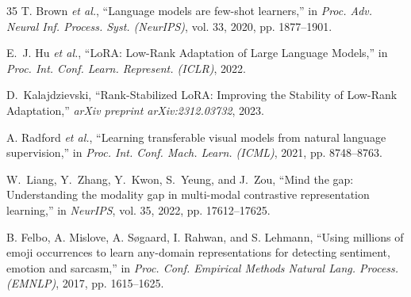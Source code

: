 \documentclass[letterpaper,journal]{IEEEtran}
\begin{document}
\begin{thebibliography}{35}
 T. Brown \textit{et al.}, ``Language models are few-shot learners,'' in \textit{Proc. Adv. Neural Inf. Process. Syst. (NeurIPS)}, vol. 33, 2020, pp. 1877--1901.

 E.~J. Hu \textit{et al.}, ``LoRA: Low-Rank Adaptation of Large Language Models,'' in \textit{Proc. Int. Conf. Learn. Represent. (ICLR)}, 2022.

 D.~Kalajdzievski, ``Rank-Stabilized LoRA: Improving the Stability of Low-Rank Adaptation,'' \textit{arXiv preprint arXiv:2312.03732}, 2023.

 A. Radford \textit{et al.}, ``Learning transferable visual models from natural language supervision,'' in \textit{Proc. Int. Conf. Mach. Learn. (ICML)}, 2021, pp. 8748--8763.

 W.~Liang, Y.~Zhang, Y.~Kwon, S.~Yeung, and J.~Zou, ``Mind the gap: Understanding the modality gap in multi-modal contrastive representation learning,'' in \textit{NeurIPS}, vol. 35, 2022, pp. 17612--17625.

 B. Felbo, A. Mislove, A. S{\o}gaard, I. Rahwan, and S. Lehmann, ``Using millions of emoji occurrences to learn any-domain representations for detecting sentiment, emotion and sarcasm,'' in \textit{Proc. Conf. Empirical Methods Natural Lang. Process. (EMNLP)}, 2017, pp. 1615--1625.

\end{thebibliography}
\end{document}
